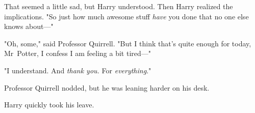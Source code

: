 That seemed a little sad, but Harry understood. Then Harry realized the
implications. "So just how much awesome stuff \emph{have} you done that no one
else knows about—"

"Oh, some," said Professor Quirrell. "But I think that's quite enough for
today, Mr~Potter, I confess I am feeling a bit tired—"

"I understand. And \emph{thank you.} For \emph{everything}."

Professor Quirrell nodded, but he was leaning harder on his desk.

Harry quickly took his leave.
